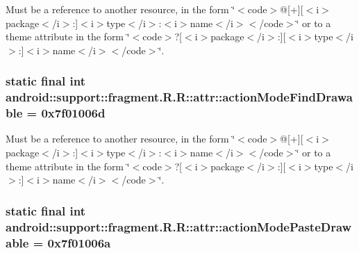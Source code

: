 Must be a reference to another resource, in the form \char`\"{}$<$code$>$@\mbox{[}+\mbox{]}\mbox{[}$<$i$>$package$<$/i$>$:\mbox{]}$<$i$>$type$<$/i$>$:$<$i$>$name$<$/i$>$$<$/code$>$\char`\"{} or to a theme attribute in the form \char`\"{}$<$code$>$?\mbox{[}$<$i$>$package$<$/i$>$:\mbox{]}\mbox{[}$<$i$>$type$<$/i$>$:\mbox{]}$<$i$>$name$<$/i$>$$<$/code$>$\char`\"{}. \hypertarget{classandroid_1_1support_1_1fragment_1_1_r_1_1attr_d4da28d530e2d6bfcf28ded0cd3a949a}{
\subsubsection[{actionModeFindDrawable}]{\setlength{\rightskip}{0pt plus 5cm}static final int android::support::fragment.R.R::attr::actionModeFindDrawable = 0x7f01006d}}
\label{classandroid_1_1support_1_1fragment_1_1_r_1_1attr_d4da28d530e2d6bfcf28ded0cd3a949a}


Must be a reference to another resource, in the form \char`\"{}$<$code$>$@\mbox{[}+\mbox{]}\mbox{[}$<$i$>$package$<$/i$>$:\mbox{]}$<$i$>$type$<$/i$>$:$<$i$>$name$<$/i$>$$<$/code$>$\char`\"{} or to a theme attribute in the form \char`\"{}$<$code$>$?\mbox{[}$<$i$>$package$<$/i$>$:\mbox{]}\mbox{[}$<$i$>$type$<$/i$>$:\mbox{]}$<$i$>$name$<$/i$>$$<$/code$>$\char`\"{}. \hypertarget{classandroid_1_1support_1_1fragment_1_1_r_1_1attr_bcbebb49b7eb50ce3b73e429ed0fc6f2}{
\subsubsection[{actionModePasteDrawable}]{\setlength{\rightskip}{0pt plus 5cm}static final int android::support::fragment.R.R::attr::actionModePasteDrawable = 0x7f01006a}}
\label{classandroid_1_1support_1_1fragment_1_1_r_1_1attr_bcbebb49b7eb50ce3b73e429ed0fc6f2}


